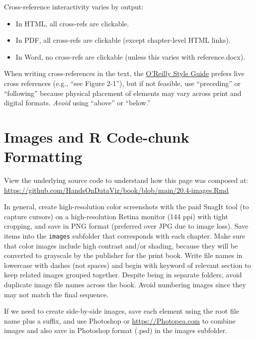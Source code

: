 \documentclass[
  english,
]{book}
\providecommand{\tightlist}{%
  \setlength{\itemsep}{0pt}\setlength{\parskip}{0pt}}
\begin{document}
Cross-reference interactivity varies by output:

\begin{itemize}
\tightlist
\item
  In HTML, all cross-refs are clickable.
\item
  In PDF, all cross-refs are clickable (except chapter-level HTML links).
\item
  In Word, no cross-refs are clickable (unless this varies with reference.docx).
\end{itemize}

When writing cross-references in the text, the \href{https://oreillymedia.github.io/production-resources/styleguide/\#considering_electronic_formats}{O'Reilly Style Guide} prefers live cross references (e.g., ``see Figure 2-1''), but if not feasible, use ``preceding'' or ``following'' because physical placement of elements may vary across print and digital formats. \emph{Avoid} using ``above'' or ``below.''

\hypertarget{images}{%
\section*{Images and R Code-chunk Formatting}\label{images}}

View the underlying source code to understand how this page was composed at: \url{https://github.com/HandsOnDataViz/book/blob/main/20.4-images.Rmd}

In general, create high-resolution color screenshots with the paid SnagIt tool (to capture cursors) on a high-resolution Retina monitor (144 ppi) with tight cropping, and save in PNG format (preferred over JPG due to image loss). Save items into the \texttt{images} subfolder that corresponds with each chapter. Make sure that color images include high contrast and/or shading, because they will be converted to grayscale by the publisher for the print book. Write file names in lowercase with dashes (not spaces) and begin with keyword of relevant section to keep related images grouped together. Despite being in separate folders, avoid duplicate image file names across the book. Avoid numbering images since they may not match the final sequence.

If we need to create side-by-side images, save each element using the root file name plus a suffix, and use Photoshop or \url{https://Photopea.com} to combine images and also save in Photoshop format (.psd) in the images subfolder.
\end{document}

